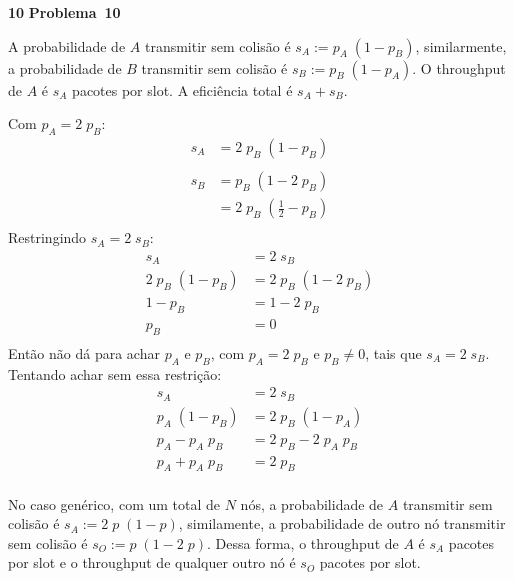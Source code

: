 \documentclass{article}
\newcounter{exe-list}
\newenvironment{exe-list}
    {\begin{list}{\alph{exe-list}.}{\usecounter{exe-list}}}
    {\end{list}}
\newenvironment{exe}[2][Problema]
    {\newcommand{\opt}{(Opcional)}%
    \newcommand{\sketch}[1]{{\bfseries Rascunho:} ##1}%
    \medskip\par\noindent\ifthenelse{\equal{#1}{}}
        {\textbf{\large #2}}
        {\textbf{\large #1~#2}}%
    \medskip\par\noindent}
    {\medskip}
\begin{document}
\begin{exe}{10}
    \begin{exe-list}
    \item
        A probabilidade de \(A\) transmitir sem colisão é
        \(s_A := p_A \; (1 - p_B)\),
        similarmente,
        a probabilidade de \(B\) transmitir sem colisão é
        \(s_B := p_B \; (1 - p_A)\).
        O throughput de \(A\) é \(s_A\) pacotes por slot.
        A eficiência total é \(s_A + s_B\).
    \item
        Com \(p_A = 2 \; p_B\):
        \begin{align*}
            s_A &= 2 \; p_B \; (1 - p_B) \\\\
            s_B &= p_B \; (1 - 2 \; p_B) \\
            &= 2 \; p_B \; \left( \frac12 - p_B \right) \\
        \end{align*}
        Restringindo \(s_A = 2 \; s_B\):
        \begin{align*}
            s_A &= 2 \; s_B \\
            2 \; p_B \; (1 - p_B) &= 2 \; p_B \; (1 - 2 \; p_B) \\
            1 - p_B &= 1 - 2 \; p_B \\
            p_B &= 0 \\
        \end{align*}
        Então não dá para achar \(p_A\) e \(p_B\),
        com \(p_A = 2 \; p_B\) e \(p_B \ne 0\),
        tais que \(s_A = 2 \; s_B\).
        Tentando achar sem essa restrição:
        \begin{align*}
            s_A &= 2 \; s_B \\
            p_A \; (1 - p_B) &= 2 \; p_B \; (1 - p_A) \\
            p_A - p_A \; p_B &= 2 \; p_B - 2 \; p_A \; p_B \\
            p_A + p_A \; p_B &= 2 \; p_B \\
        \end{align*}
    \item
        No caso genérico,
        com um total de \(N\) nós,
        a probabilidade de \(A\) transmitir sem colisão é
        \(s_A := 2 \; p \; (1 - p)\),
        similamente,
        a probabilidade de outro nó transmitir sem colisão é
        \(s_O := p \; (1 - 2 \; p)\).
        Dessa forma,
        o throughput de \(A\) é \(s_A\) pacotes por slot e
        o throughput de qualquer outro nó é \(s_O\) pacotes por slot.
    \end{exe-list}
\end{exe}
\end{document}
